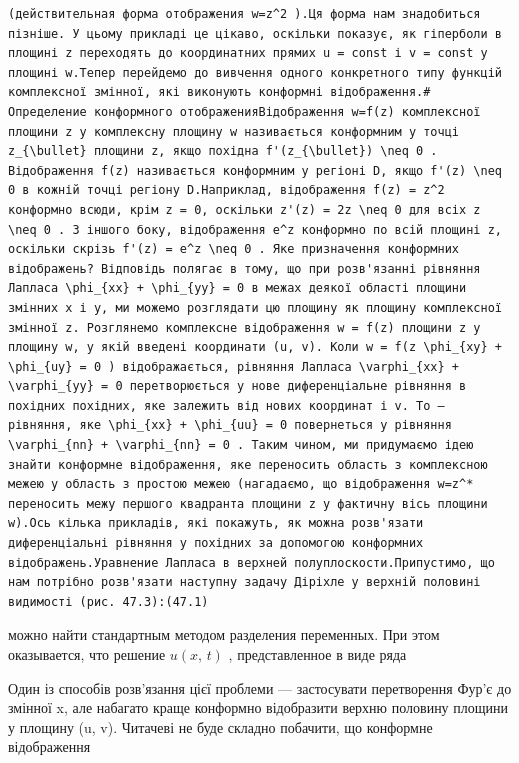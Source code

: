 \documentclass[
  ukrainian,
]{article}
\begin{document}
\begin{verbatim}
(действительная форма отображения w=z^2 ).Ця форма нам знадобиться пізніше. У цьому прикладі це цікаво, оскільки показує, як гіперболи в площині z переходять до координатних прямих u = const і v = const у площині w.Тепер перейдемо до вивчення одного конкретного типу функцій комплексної змінної, які виконують конформні відображення.# Определение конформного отображенияВідображення w=f(z) комплексної площини z у комплексну площину w називається конформним у точці z_{\bullet} площини z, якщо похідна f'(z_{\bullet}) \neq 0 . Відображення f(z) називається конформним у регіоні D, якщо f'(z) \neq 0 в кожній точці регіону D.Наприклад, відображення f(z) = z^2 конформно всюди, крім z = 0, оскільки z'(z) = 2z \neq 0 для всіх z \neq 0 . З іншого боку, відображення e^z конформно по всій площині z, оскільки скрізь f'(z) = e^z \neq 0 . Яке призначення конформних відображень? Відповідь полягає в тому, що при розв'язанні рівняння Лапласа \phi_{xx} + \phi_{yy} = 0 в межах деякої області площини змінних x і y, ми можемо розглядати цю площину як площину комплексної змінної z. Розглянемо комплексне відображення w = f(z) площини z у площину w, у якій введені координати (u, v). Коли w = f(z \phi_{xy} + \phi_{uy} = 0 ) відображається, рівняння Лапласа \varphi_{xx} + \varphi_{yy} = 0 перетворюється у нове диференціальне рівняння в похідних похідних, яке залежить від нових координат і v. To — рівняння, яке \phi_{xx} + \phi_{uu} = 0 повернеться у рівняння \varphi_{nn} + \varphi_{nn} = 0 . Таким чином, ми придумаємо ідею знайти конформне відображення, яке переносить область з комплексною межею у область з простою межею (нагадаємо, що відображення w=z^* переносить межу першого квадранта площини z у фактичну вісь площини w).Ось кілька прикладів, які покажуть, як можна розв'язати диференціальні рівняння у похідних за допомогою конформних відображень.Уравнение Лапласа в верхней полуплоскости.Припустимо, що нам потрібно розв'язати наступну задачу Діріхле у верхній половині видимості (рис. 47.3):(47.1)
\end{verbatim}

можно найти стандартным методом разделения переменных. При этом
оказывается, что решение \(u\left(x,\,t\right)\) , представленное в виде
ряда

Один із способів розв'язання цієї проблеми --- застосувати перетворення
Фур'є до змінної x, але набагато краще конформно відобразити верхню
половину площини у площину (u, v). Читачеві не буде складно побачити, що
конформне відображення
\end{document}
